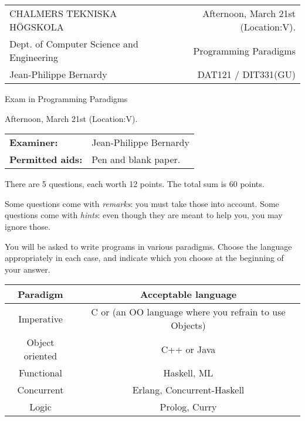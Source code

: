 \documentclass{article}
\begin{document}
\setlength{\parskip}{2pt}

\newcommand{\examtime}{Afternoon, March 21st  (Location:V)}
\newcommand{\points}[1]{\marginpar{\bf #1 points}}
\noindent
\begin{tabular}{lr}
CHALMERS TEKNISKA H\"OGSKOLA &\examtime{}.\\
Dept. of Computer Science and Engineering & Programming Paradigms\\
Jean-Philippe Bernardy                 & DAT121 / DIT331(GU) \\
\end{tabular}

\vspace{2.5cm} \noindent
\begin{center} {\LARGE
Exam in Programming Paradigms}
\end{center}

\vspace{1.5cm}

\noindent
\examtime{}.\\
\begin{tabular}{ll}
\textbf{Examiner:} & Jean-Philippe Bernardy \\
\textbf{Permitted aids:} & Pen and blank paper.
\end{tabular}
\vspace{1cm}

\noindent

There are 5 questions, each worth 12 points. The total sum is 60
points.

Some questions come with \emph{remarks}: you must take those
into account.
Some questions come with \emph{hints}: even though they are meant to help you, you may ignore those.

You will be asked to write programs in various paradigms. Choose the
language appropriately in each case, and indicate which you choose at
the beginning of your answer.

\begin{tabular}[p]{cc}
  Paradigm & Acceptable language \\ \hline
  Imperative   & C or (an OO language where you refrain to use Objects) \\
  Object oriented & C++ or Java \\
  Functional & Haskell, ML \\
  Concurrent & Erlang, Concurrent-Haskell \\
  Logic & Prolog, Curry
\end{tabular}
\end{document}
